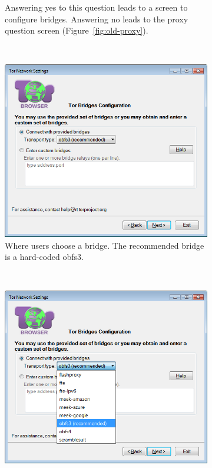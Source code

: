 \documentclass[USenglish,oneside,twocolumn]{article}
\begin{document}
\begin{figure}
\begin{subfigure}[b]{0.30\textwidth}
	\caption{Answering yes to this question leads to a screen to configure bridges. Answering no leads to the proxy question screen (Figure~\ref{fig:old-proxy}).}
	\label{fig:old-bridge}
\end{subfigure}
~~~~~~~~~~
\begin{subfigure}[b]{0.30\textwidth}
	\includegraphics[width=\textwidth]{screenshots/OLD-bridgeSettings.png}
	\caption{Where users choose a bridge. The recommended bridge is a hard-coded obfs3.}
	\label{fig:old-bridge-settings}
\end{subfigure}
~~~~~~~~~~
\begin{subfigure}[b]{0.30\textwidth}
	\includegraphics[width=\textwidth]{screenshots/OLD-bridgeSettings-combobox.png}

\end{subfigure}
\end{figure}
\end{document}
